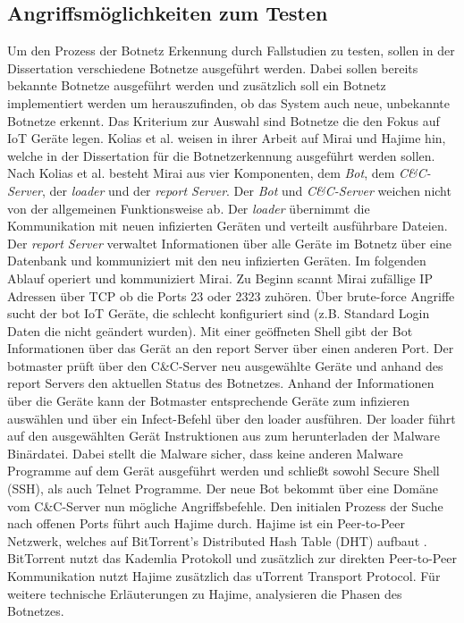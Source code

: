 \subsection*{Angriffsmöglichkeiten zum Testen}
Um den Prozess der Botnetz Erkennung durch Fallstudien zu testen, sollen in der Dissertation verschiedene Botnetze ausgeführt werden. Dabei sollen bereits bekannte Botnetze ausgeführt werden und 
zusätzlich soll ein Botnetz implementiert werden um herauszufinden, ob das System auch neue, unbekannte Botnetze erkennt. Das Kriterium zur Auswahl sind Botnetze die den Fokus auf IoT Geräte legen. 
Kolias et al. \cite{DBLP:journals/computer/KoliasKSV17} weisen in ihrer Arbeit auf Mirai und Hajime hin, welche in der Dissertation für die Botnetzerkennung ausgeführt werden sollen.
Nach Kolias et al. besteht Mirai aus vier Komponenten, dem \textit{Bot}, dem \textit{C\&C-Server}, der \textit{loader} und der \textit{report Server}. 
Der \textit{Bot} und \textit{C\&C-Server} weichen nicht von der allgemeinen Funktionsweise ab. Der \textit{loader} übernimmt die Kommunikation mit neuen infizierten 
Geräten und verteilt ausführbare Dateien. Der \textit{report Server} verwaltet Informationen über alle Geräte im Botnetz über eine Datenbank und kommuniziert mit den neu infizierten Geräten. 
Im folgenden Ablauf operiert und kommuniziert Mirai. 
Zu Beginn scannt Mirai zufällige IP Adressen über TCP ob die Ports 23 oder 2323 zuhören. Über brute-force Angriffe sucht der bot IoT Geräte, die schlecht konfiguriert sind (z.B. Standard Login Daten die
nicht geändert wurden). Mit einer geöffneten Shell gibt der Bot Informationen über das Gerät an den report Server über einen anderen Port. Der botmaster prüft über den C\&C-Server neu ausgewählte Geräte 
und anhand des report Servers den aktuellen Status des Botnetzes. Anhand der Informationen über die Geräte kann der Botmaster entsprechende Geräte zum infizieren auswählen und über ein Infect-Befehl 
über den loader ausführen. Der loader führt auf den ausgewählten Gerät Instruktionen aus zum herunterladen der Malware Binärdatei. Dabei stellt die Malware sicher, dass keine anderen Malware Programme auf
dem Gerät ausgeführt werden und schließt sowohl Secure Shell (SSH), als auch Telnet Programme. Der neue Bot bekommt über eine Domäne vom C\&C-Server nun mögliche Angriffsbefehle. Den initialen Prozess 
der Suche nach offenen Ports führt auch Hajime durch. Hajime ist ein Peer-to-Peer Netzwerk, welches auf BitTorrent's Distributed Hash Table (DHT) aufbaut \cite{DBLP:conf/ndss/HerwigHHRL19,2017AnalyzingTP}. 
BitTorrent nutzt das Kademlia Protokoll \cite{DBLP:conf/iptps/MaymounkovM02} und zusätzlich zur direkten Peer-to-Peer Kommunikation nutzt Hajime zusätzlich das uTorrent Transport Protocol. Für weitere
technische Erläuterungen zu Hajime, analysieren \cite{DBLP:conf/ndss/HerwigHHRL19} die Phasen des Botnetzes. 

